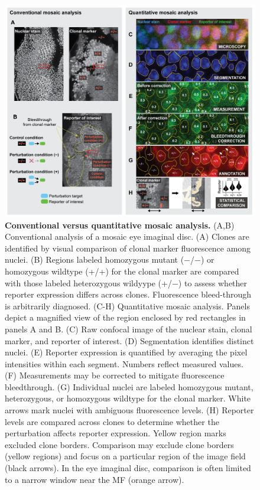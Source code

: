 \documentclass[10pt,letterpaper]{article}
\begin{document}
\begin{figure}[!h]
\centering
\includegraphics[width=1.0\columnwidth]{./figure_2}
\caption{\textbf{Conventional versus quantitative mosaic analysis.}
(A,B) Conventional analysis of a mosaic eye imaginal disc. (A) Clones are identified by visual comparison of clonal marker fluorescence among nuclei. (B) Regions labeled homozygous mutant ($-$/$-$) or homozygous wildtype (+/+) for the clonal marker are compared with those labeled heterozygous wildyype (+/$-$) to assess whether reporter expression differs across clones. Fluorescence bleed-through is arbitrarily diagnosed. (C-H) Quantitative mosaic analysis. Panels depict a magnified view of the region enclosed by red rectangles in panels A and B. (C) Raw confocal image of the nuclear stain, clonal marker, and reporter of interest. (D) Segmentation identifies distinct nuclei. (E) Reporter expression is quantified by averaging the pixel intensities within each segment. Numbers reflect measured values. (F) Measurements may be corrected to mitigate fluorescence bleedthrough. (G) Individual nuclei are labeled homozygous mutant, heterozygous, or homozygous wildtype for the clonal marker. White arrows mark nuclei with ambiguous fluorescence levels. (H) Reporter levels are compared across clones to determine whether the perturbation affects reporter expression. Yellow region marks excluded clone borders. Comparison may exclude clone borders (yellow regions) and focus on a particular region of the image field (black arrows). In the eye imaginal disc, comparison is often limited to a narrow window near the MF (orange arrow).}
\label{fig2}
\end{figure}
\end{document}
